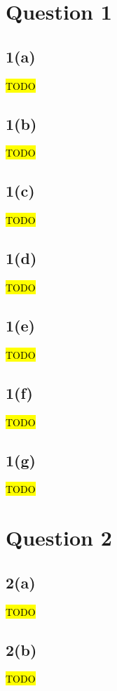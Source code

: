 \documentclass[10pt, a4paper,reqno]{article}
\begin{document}



%
%
\section*{Question 1}

\subsection*{1(a)}
\hl{TODO}

\subsection*{1(b)}
\hl{TODO}

\subsection*{1(c)}
\hl{TODO}

\subsection*{1(d)}
\hl{TODO}

\subsection*{1(e)}
\hl{TODO}

\subsection*{1(f)}
\hl{TODO}

\subsection*{1(g)}
\hl{TODO}


%
%
\clearpage\section*{Question 2}

\subsection*{2(a)}
\hl{TODO}

\subsection*{2(b)}
\hl{TODO}
\end{document}
